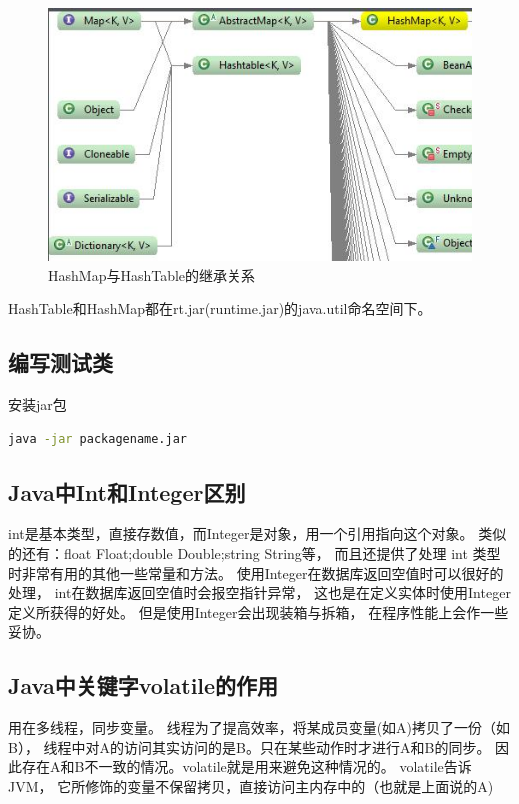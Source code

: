 \documentclass{book}
\begin{document}
\begin{figure}[htbp]
	\centering
	\includegraphics[scale=0.6]{HashMapAndHashTable.jpg}
	\caption{HashMap与HashTable的继承关系}
	\label{fig:HashMapAndHashTable}
\end{figure}

HashTable和HashMap都在rt.jar(runtime.jar)的java.util命名空间下。

\subsection{编写测试类}

安装jar包

\begin{lstlisting}[language=Bash]
java -jar packagename.jar
\end{lstlisting}

\subsection{Java中Int和Integer区别}

int是基本类型，直接存数值，而Integer是对象，用一个引用指向这个对象。
类似的还有：float Float;double Double;string String等，
而且还提供了处理 int 类型时非常有用的其他一些常量和方法。
使用Integer在数据库返回空值时可以很好的处理，
int在数据库返回空值时会报空指针异常，
这也是在定义实体时使用Integer定义所获得的好处。
但是使用Integer会出现装箱与拆箱，
在程序性能上会作一些妥协。

\subsection{Java中关键字volatile的作用}

用在多线程，同步变量。 线程为了提高效率，将某成员变量(如A)拷贝了一份（如B），
线程中对A的访问其实访问的是B。只在某些动作时才进行A和B的同步。
因此存在A和B不一致的情况。volatile就是用来避免这种情况的。
volatile告诉JVM， 它所修饰的变量不保留拷贝，直接访问主内存中的（也就是上面说的A) 
\end{document}
